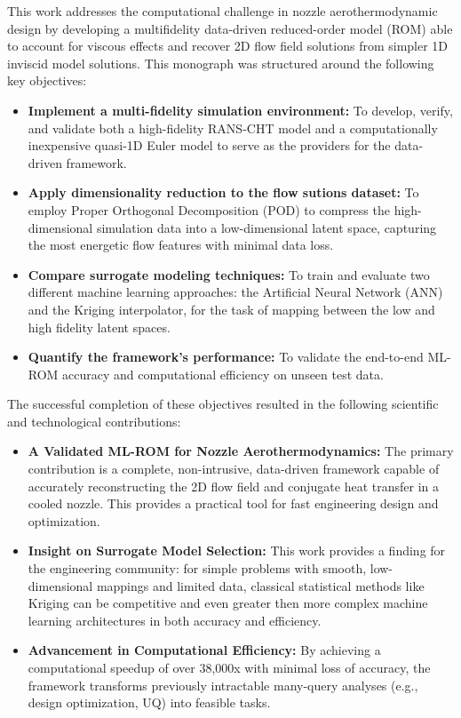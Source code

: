 \documentclass[tg, EN]{ufabcFHZh_tg}
\begin{document}
This work addresses the computational challenge in nozzle aerothermodynamic design by developing a multifidelity data-driven reduced-order model (ROM) able to account for viscous effects and recover 2D flow field solutions from simpler 1D inviscid model solutions. This monograph was structured around the following key objectives:

\begin{itemize}
    \item \textbf{Implement a multi-fidelity simulation environment:} To develop, verify, and validate both a high-fidelity RANS-CHT model and a computationally inexpensive quasi-1D Euler model to serve as the providers for the data-driven framework.

    \item \textbf{Apply dimensionality reduction to the flow sutions dataset:} To employ Proper Orthogonal Decomposition (POD) to compress the high-dimensional simulation data into a low-dimensional latent space, capturing the most energetic flow features with minimal data loss.

    \item \textbf{Compare surrogate modeling techniques:} To train and evaluate two different machine learning approaches: the Artificial Neural Network (ANN) and the Kriging interpolator, for the task of mapping between the low and high fidelity latent spaces.
    
    \item \textbf{Quantify the framework's performance:} To validate the end-to-end ML-ROM accuracy and computational efficiency on unseen test data.
\end{itemize}

The successful completion of these objectives resulted in the following scientific and technological contributions:

\begin{itemize}
    \item \textbf{A Validated ML-ROM for Nozzle Aerothermodynamics:} The primary contribution is a complete, non-intrusive, data-driven framework capable of accurately reconstructing the 2D flow field and conjugate heat transfer in a cooled nozzle. This provides a practical tool for fast engineering design and optimization.

    \item \textbf{Insight on Surrogate Model Selection:} This work provides a finding for the engineering community: for simple problems with smooth, low-dimensional mappings and limited data, classical statistical methods like Kriging can be competitive and even greater then more complex machine learning architectures in both accuracy and efficiency.

    \item \textbf{Advancement in Computational Efficiency:} By achieving a computational speedup of over 38,000x with minimal loss of accuracy, the framework transforms previously intractable many-query analyses (e.g., design optimization, UQ) into feasible tasks.
\end{itemize}
\end{document}
